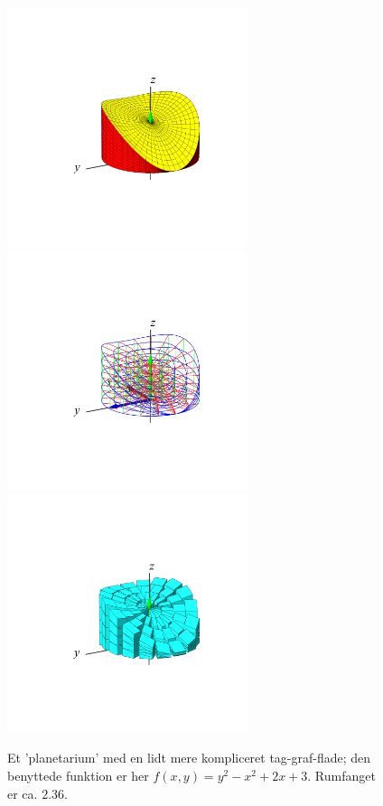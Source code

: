 \begin{figure}[h]
\centerline{\includegraphics[height=70mm]{FIGS/plotGrafHypVol1} \includegraphics[height=70mm]{FIGS/plotGrafHypVol2} \includegraphics[height=70mm]{FIGS/plotGrafHypVol3}}
\begin{center}
\caption{\small{Et 'planetarium' med en lidt mere kompliceret tag-graf-flade; den benyttede funktion er her $f(x,y)= y^{2} - x^{2}+ 2x +3$. Rumfanget er ca. $2.36$.}}
\label{figGrafHypVol}
\end{center}
\end{figure}



